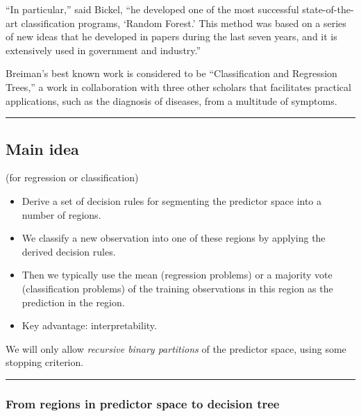 \documentclass[
  letterpaper,
  DIV=11,
  numbers=noendperiod]{scrartcl}
\providecommand{\tightlist}{%
  \setlength{\itemsep}{0pt}\setlength{\parskip}{0pt}}\usepackage{longtable,booktabs,array}
\begin{document}
``In particular,'' said Bickel, ``he developed one of the most
successful state-of-the-art classification programs, `Random Forest.'
This method was based on a series of new ideas that he developed in
papers during the last seven years, and it is extensively used in
government and industry.''

Breiman's best known work is considered to be ``Classification and
Regression Trees,'' a work in collaboration with three other scholars
that facilitates practical applications, such as the diagnosis of
diseases, from a multitude of symptoms.

\begin{center}\rule{0.5\linewidth}{0.5pt}\end{center}

\hypertarget{main-idea}{%
\subsection{Main idea}\label{main-idea}}

(for regression or classification)

\begin{itemize}
\tightlist
\item
  Derive a set of decision rules for segmenting the predictor space into
  a number of regions.
\item
  We classify a new observation into one of these regions by applying
  the derived decision rules.
\item
  Then we typically use the mean (regression problems) or a majority
  vote (classification problems) of the training observations in this
  region as the prediction in the region.
\item
  Key advantage: interpretability.
\end{itemize}

We will only allow \emph{recursive binary partitions} of the predictor
space, using some stopping criterion.

\begin{center}\rule{0.5\linewidth}{0.5pt}\end{center}

\hypertarget{from-regions-in-predictor-space-to-decision-tree}{%
\subsubsection{From regions in predictor space to decision
tree}\label{from-regions-in-predictor-space-to-decision-tree}}
\end{document}
